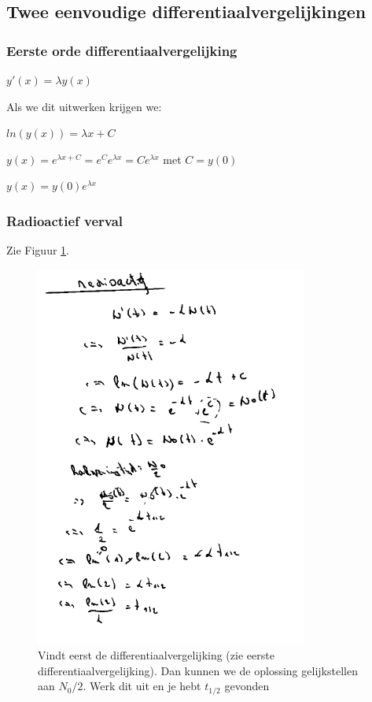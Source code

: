 \documentclass[a4paper]{report}
\begin{document}
\subsection{Twee eenvoudige differentiaalvergelijkingen}

\subsubsection{Eerste orde differentiaalvergelijking}

$y'(x) = \lambda y(x)$

Als we dit uitwerken krijgen we:

$ln(y(x)) = \lambda x + C$

$y(x) = e^{\lambda x + C} = e^C e^{\lambda x} = C e^{\lambda x}$ met $C = y(0)$

$y(x) = y(0) e^{\lambda x}$

\subsubsection*{Radioactief verval}

Zie Figuur \ref{fig:radio_solution}.

\begin{figure}[htbp!]
	\centering
	\includegraphics[width=0.8\textwidth]{assets/radio_solution.png}
	\caption{Vindt eerst de differentiaalvergelijking (zie eerste differentiaalvergelijking). Dan kunnen we de oplossing gelijkstellen aan $N_0 / 2$. Werk dit uit en je hebt $t_{1/2}$ gevonden}
	\label{fig:radio_solution}
\end{figure}
\end{document}
